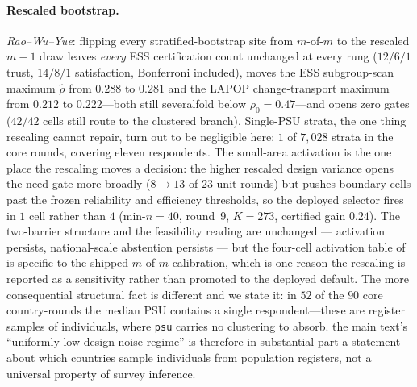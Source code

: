 \documentclass[12pt]{article}
\theoremstyle{definition}
\theoremstyle{remark}
\newcommand{\rhohat}{\widehat{\rho}}
\begin{document}
\paragraph{Rescaled bootstrap.} \emph{Rao--Wu--Yue}:
flipping every stratified-bootstrap site from $m$-of-$m$ to the rescaled $m{-}1$
draw leaves \emph{every} ESS certification count unchanged at every rung
($12/6/1$ trust, $14/8/1$ satisfaction, Bonferroni included), moves the ESS
subgroup-scan maximum $\rhohat$ from $0.288$ to $0.281$ and the LAPOP
change-transport maximum from $0.212$ to $0.222$---both still severalfold below
$\rho_0=0.47$---and opens zero gates ($42/42$ cells still route to the clustered branch).
Single-PSU strata, the one thing rescaling cannot repair, turn out to be
negligible here: $1$ of $7{,}028$ strata in the core rounds, covering
eleven respondents. The small-area activation is the one place the rescaling
moves a decision:
the higher rescaled design variance opens the need gate more broadly ($8\to13$
of $23$ unit-rounds) but pushes boundary cells past the frozen reliability and
efficiency thresholds, so the deployed selector fires in $1$ cell rather than
$4$ (min-$n=40$, round~9, $K=273$, certified gain $0.24$). The two-barrier
structure and the feasibility reading are unchanged --- activation persists,
national-scale abstention persists --- but the four-cell activation table of is specific to the shipped $m$-of-$m$ calibration, which is one
reason the rescaling is reported as a sensitivity rather than promoted to the
deployed default. The more consequential structural fact is different and we
state it: in $52$ of the $90$ core country-rounds the median PSU
contains a single respondent---these are register samples of individuals, where
\texttt{psu} carries no clustering to absorb. the main text's
``uniformly low design-noise regime'' is therefore in substantial part a
statement about which countries sample individuals from population registers,
not a universal property of survey inference.
\end{document}
